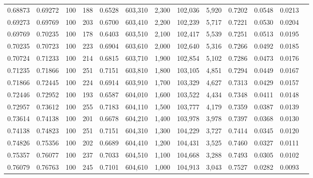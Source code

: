 \begin{tabular}{rrrrrrrrrrrrr}
0.68873 & 0.69272 &   100 & 188 &                                     0.6528 & 603,310 &   2,300 & 102,036 &   5,920 & 0.7202 & 0.0548 & 0.0213 \\
0.69273 & 0.69769 &   100 & 203 &                                     0.6700 & 603,410 &   2,200 & 102,239 &   5,717 & 0.7221 & 0.0530 & 0.0204 \\
0.69769 & 0.70235 &   100 & 178 &                                     0.6403 & 603,510 &   2,100 & 102,417 &   5,539 & 0.7251 & 0.0513 & 0.0195 \\
0.70235 & 0.70723 &   100 & 223 &                                     0.6904 & 603,610 &   2,000 & 102,640 &   5,316 & 0.7266 & 0.0492 & 0.0185 \\
0.70724 & 0.71233 &   100 & 214 &                                     0.6815 & 603,710 &   1,900 & 102,854 &   5,102 & 0.7286 & 0.0473 & 0.0176 \\
0.71235 & 0.71866 &   100 & 251 &                                     0.7151 & 603,810 &   1,800 & 103,105 &   4,851 & 0.7294 & 0.0449 & 0.0167 \\
0.71866 & 0.72445 &   100 & 224 &                                     0.6914 & 603,910 &   1,700 & 103,329 &   4,627 & 0.7313 & 0.0429 & 0.0157 \\
0.72446 & 0.72952 &   100 & 193 &                                     0.6587 & 604,010 &   1,600 & 103,522 &   4,434 & 0.7348 & 0.0411 & 0.0148 \\
0.72957 & 0.73612 &   100 & 255 &                                     0.7183 & 604,110 &   1,500 & 103,777 &   4,179 & 0.7359 & 0.0387 & 0.0139 \\
0.73614 & 0.74138 &   100 & 201 &                                     0.6678 & 604,210 &   1,400 & 103,978 &   3,978 & 0.7397 & 0.0368 & 0.0130 \\
0.74138 & 0.74823 &   100 & 251 &                                     0.7151 & 604,310 &   1,300 & 104,229 &   3,727 & 0.7414 & 0.0345 & 0.0120 \\
0.74826 & 0.75356 &   100 & 202 &                                     0.6689 & 604,410 &   1,200 & 104,431 &   3,525 & 0.7460 & 0.0327 & 0.0111 \\
0.75357 & 0.76077 &   100 & 237 &                                     0.7033 & 604,510 &   1,100 & 104,668 &   3,288 & 0.7493 & 0.0305 & 0.0102 \\
0.76079 & 0.76763 &   100 & 245 &                                     0.7101 & 604,610 &   1,000 & 104,913 &   3,043 & 0.7527 & 0.0282 & 0.0093 \\

\end{tabular}
